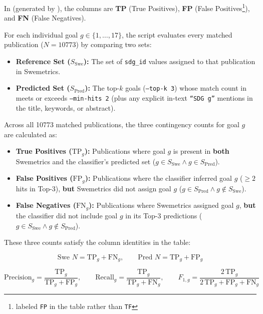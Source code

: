 In  (generated by ), the columns are \textbf{TP} (True Positives), \textbf{FP} (False Positives\footnote{labeled \texttt{FP} in the table rather than  \texttt{TF}}), and \textbf{FN} (False Negatives).

For each individual goal $g \in \{1, \dots, 17\}$, the script evaluates every matched publication ($N = \num{10773}$) by comparing two sets:
\begin{itemize}
    \item \textbf{Reference Set ($S_{\text{Swe}}$):} The set of \texttt{sdg\_id} values assigned to that publication in Swemetrics.


    \item \textbf{Predicted Set ($S_{\text{Pred}}$):} The top-$k$ goals (\texttt{--top-k 3}) whose match count in  meets or exceeds \texttt{--min-hits 2} (plus any explicit in-text \texttt{\enquote{SDG g}} mentions in the title, keywords, or abstract).
\end{itemize}


Across all \num{10773} matched publications, the three contingency counts for goal $g$ are calculated as:
\begin{itemize}
    \item \textbf{True Positives ($\text{TP}_g$):} Publications where goal $g$ is present in \textbf{both} Swemetrics and the classifier's predicted set ($g \in S_{\text{Swe}} \land g \in S_{\text{Pred}}$).


    \item \textbf{False Positives ($\text{FP}_g$):} Publications where the classifier inferred goal $g$ ($\ge 2$ hits in Top-$3$), \textbf{but} Swemetrics did not assign goal $g$ ($g \in S_{\text{Pred}} \land g \notin S_{\text{Swe}}$).


    \item \textbf{False Negatives ($\text{FN}_g$):} Publications where Swemetrics assigned goal $g$, \textbf{but} the classifier did not include goal $g$ in its Top-$3$ predictions ($g \in S_{\text{Swe}} \land g \notin S_{\text{Pred}}$).
\end{itemize}


These three counts satisfy the column identities in the table:

$$\text{Swe } N = \text{TP}_g + \text{FN}_g, \qquad \text{Pred } N = \text{TP}_g + \text{FP}_g$$

$$\text{Precision}_g = \frac{\text{TP}_g}{\text{TP}_g + \text{FP}_g}, \qquad \text{Recall}_g = \frac{\text{TP}_g}{\text{TP}_g + \text{FN}_g}, \qquad F_{1,g} = \frac{2\,\text{TP}_g}{2\,\text{TP}_g + \text{FP}_g + \text{FN}_g}$$

